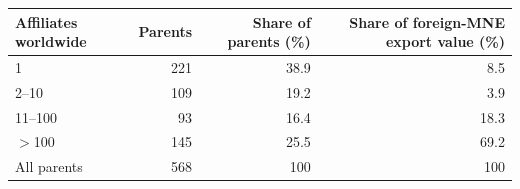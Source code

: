 \begin{tabular}{lrrr}
\toprule
Affiliates worldwide & Parents & Share of parents (\%) & Share of foreign-MNE export value (\%) \\
\midrule
1 & 221 & 38.9 & 8.5 \\
2--10 & 109 & 19.2 & 3.9 \\
11--100 & 93 & 16.4 & 18.3 \\
$>$100 & 145 & 25.5 & 69.2 \\
\midrule
All parents & 568 & 100 & 100 \\
\bottomrule
\end{tabular}
